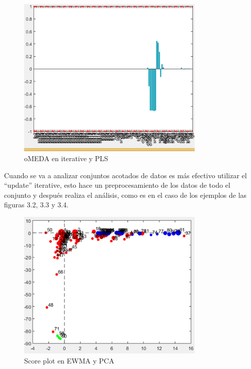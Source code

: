 \begin{figure}[H]
\centering
\includegraphics[width=0.8\textwidth]{imagenes/figuras/3_4.png}
\caption{oMEDA en iterative y PLS}
\end{figure}

\bigskip

Cuando se va a analizar conjuntos acotados de datos es más efectivo utilizar el “update” iterative, esto hace un preprocesamiento de los datos de todo el conjunto y después realiza el análisis, como es en el caso de los ejemplos de las figuras 3.2, 3.3 y 3.4. 
\bigskip

\begin{figure}[H]
\centering
\includegraphics[width=0.8\textwidth]{imagenes/figuras/3_5.png}
\caption{Score plot en EWMA y PCA}
\end{figure}


